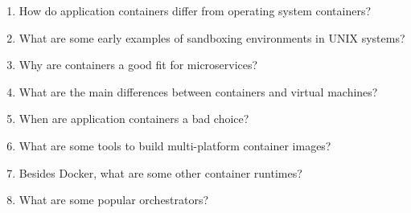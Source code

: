 \begin{enumerate}
\item
How do application containers differ from operating system containers?

\item
What are some early examples of sandboxing environments in UNIX systems?

\item
Why are containers a good fit for microservices?

\item
What are the main differences between containers and virtual machines?

\item
When are application containers a bad choice?

\item
What are some tools to build multi-platform container images?

\item
Besides Docker, what are some other container runtimes?

\item
What are some popular orchestrators?
\end{enumerate}